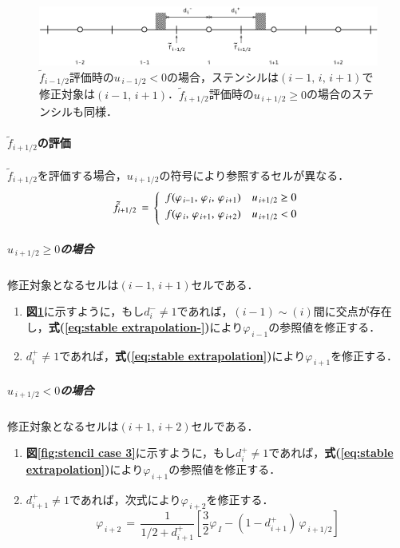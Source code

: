 \begin{figure}[htbp]
\begin{center}
\includegraphics[width=15cm,clip]{stencil_case2.eps}
\end{center}
\caption{$\tilde{f}_{i-1/2}$評価時の$u_{\,i-1/2}<0$の場合，ステンシルは$(i-1,\,i,\,i+1)$で修正対象は$(i-1,\,i+1)$．$\tilde{f}_{i+1/2}$評価時の$u_{\,i+1/2}\ge0$の場合のステンシルも同様．}
\label{fig:stencil case 2}
\end{figure}


%
\paragraph{$\tilde{f}_{i+1/2}$の評価}
$\tilde{f}_{i+1/2}$を評価する場合，$u_{\,i+1/2}$の符号により参照するセルが異なる．
\[
\tilde{f}_{i+1/2}\,=\,
\left\{
\begin{array}{ll}
\vspace{1mm}
f(\varphi_{\,i-1},\,\varphi_{\,i},\,\varphi_{\,i+1}) & u_{\,i+1/2}\ge0\\
\vspace{1mm}
f(\varphi_{\,i},\,\varphi_{\,i+1},\,\varphi_{\,i+2}) & u_{\,i+1/2}<0\\
\end{array}
\right.
\]


%
\vspace{5mm}
\subparagraph{$u_{\,i+1/2}\ge0$の場合}
修正対象となるセルは$(i-1,\,i+1)$セルである．

\begin{enumerate}
\item \textbf{図\ref{fig:stencil case 2}}に示すように，もし$d_i^- \ne 1$であれば，$(i-1)\sim (i)$間に交点が存在し，\textbf{式(\ref{eq:stable extrapolation-})}により$\varphi_{\,i-1}$の参照値を修正する．
\vspace{1mm}
\item $d_{i}^+ \ne 1$であれば，\textbf{式(\ref{eq:stable extrapolation})}により$\varphi_{\,i+1}$を修正する．
\end{enumerate}


%
\vspace{5mm}
\subparagraph{$u_{\,i+1/2}<0$の場合}
修正対象となるセルは$(i+1,\,i+2)$セルである．

\begin{enumerate}
\item \textbf{図\ref{fig:stencil case 3}}に示すように，もし$d_i^+ \ne 1$であれば，\textbf{式(\ref{eq:stable extrapolation})}により$\varphi_{\,i+1}$の参照値を修正する．
\vspace{1mm}
\item $d_{i+1}^+ \ne 1$であれば，次式により$\varphi_{\,i+2}$を修正する．
\begin{equation}
\varphi_{\,i+2} \,=\, \frac{1}{1/2+d_{i+1}^+} \left[ \frac{3}{2}\varphi_{\,I} - (1-d_{i+1}^+)\,\varphi_{\,i+1/2} \right]
\label{eq:modify i+2}
\end{equation}
\end{enumerate}

